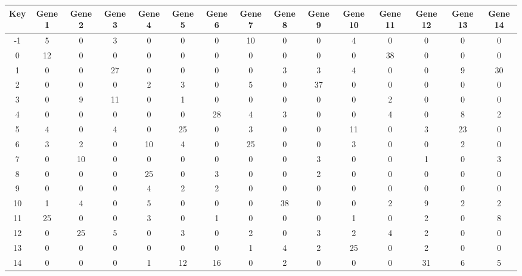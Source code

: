 \begin{tabular}{|c|c|c|c|c|c|c|c|c|c|c|c|c|c|c|}
\hline
Key & Gene 1 & Gene 2 & Gene 3 & Gene 4 & Gene 5 & Gene 6 & Gene 7 & Gene 8 & Gene 9 & Gene 10 & Gene 11 & Gene 12 & Gene 13 & Gene 14 \\
\hline
-1 & 5 & 0 & 3 & 0 & 0 & 0 & 10 & 0 & 0 & 4 & 0 & 0 & 0 & 0 \\
0 & 12 & 0 & 0 & 0 & 0 & 0 & 0 & 0 & 0 & 0 & 38 & 0 & 0 & 0 \\
1 & 0 & 0 & 27 & 0 & 0 & 0 & 0 & 3 & 3 & 4 & 0 & 0 & 9 & 30 \\
2 & 0 & 0 & 0 & 2 & 3 & 0 & 5 & 0 & 37 & 0 & 0 & 0 & 0 & 0 \\
3 & 0 & 9 & 11 & 0 & 1 & 0 & 0 & 0 & 0 & 0 & 2 & 0 & 0 & 0 \\
4 & 0 & 0 & 0 & 0 & 0 & 28 & 4 & 3 & 0 & 0 & 4 & 0 & 8 & 2 \\
5 & 4 & 0 & 4 & 0 & 25 & 0 & 3 & 0 & 0 & 11 & 0 & 3 & 23 & 0 \\
6 & 3 & 2 & 0 & 10 & 4 & 0 & 25 & 0 & 0 & 3 & 0 & 0 & 2 & 0 \\
7 & 0 & 10 & 0 & 0 & 0 & 0 & 0 & 0 & 3 & 0 & 0 & 1 & 0 & 3 \\
8 & 0 & 0 & 0 & 25 & 0 & 3 & 0 & 0 & 2 & 0 & 0 & 0 & 0 & 0 \\
9 & 0 & 0 & 0 & 4 & 2 & 2 & 0 & 0 & 0 & 0 & 0 & 0 & 0 & 0 \\
10 & 1 & 4 & 0 & 5 & 0 & 0 & 0 & 38 & 0 & 0 & 2 & 9 & 2 & 2 \\
11 & 25 & 0 & 0 & 3 & 0 & 1 & 0 & 0 & 0 & 1 & 0 & 2 & 0 & 8 \\
12 & 0 & 25 & 5 & 0 & 3 & 0 & 2 & 0 & 3 & 2 & 4 & 2 & 0 & 0 \\
13 & 0 & 0 & 0 & 0 & 0 & 0 & 1 & 4 & 2 & 25 & 0 & 2 & 0 & 0 \\
14 & 0 & 0 & 0 & 1 & 12 & 16 & 0 & 2 & 0 & 0 & 0 & 31 & 6 & 5 \\
\hline
\end{tabular}